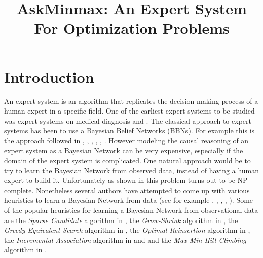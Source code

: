 \documentclass[11pt, letterpaper]{article}
\title{AskMinmax: An Expert System For Optimization Problems}
\author{}
\theoremstyle{definition}
\theoremstyle{remark}
\begin{document}
\maketitle

\section{Introduction}
An expert system is an algorithm that replicates the decision making
process of a human expert in a specific field. One of the earliest expert systems to be
studied was expert systems on medical diagnosis \cite{feigenbaum1979themes} and
\cite{lindsay1993dendral}. The classical approach to expert systems has been to use 
a Bayesian Belief Networks (BBNs). For example this is the approach followed in 
\cite{neapolitan2012probabilistic}, \cite{cowell2006probabilistic},
 \cite{cooper1992bayesian}, \cite{heckerman1998tutorial}, \cite{lauritzen1988local}, \cite{spiegelhalter1993bayesian}.
 However modeling the causal reasoning of an expert system as a Bayesian Network can be very expensive, especially
 if the domain of the expert system is complicated. One natural approach would be to try to learn the Bayesian
 Network from observed data, instead of having a human expert to build it. Unfortunately as shown in \cite{chickering1996learning}
  this problem turns out to be NP-complete. Nonetheless several authors have attempted to come up with various heuristics
  to learn a Bayesian Network from data (see for example \cite{margaritis2003learning}, \cite{cheng1997learning}, 
 \cite{friedman1997sequential}, \cite{heckerman1995learning}, \cite{friedman1999learning}). Some of the popular
 heuristics for learning a Bayesian Network from observational data are the \emph{Sparse Candidate} algorithm in 
 \cite{friedman1999learning}, the \emph{Grow-Shrink} algorithm in 
\cite{margaritis2003learning}, the \emph{Greedy Equivalent Search} algorithm in \cite{chickering2003optimal},
the \emph{Optimal Reinsertion} algorithm in \cite{moore2003optimal},
the \emph{Incremental Association} algorithm in  \cite{tsamardinos2003algorithms}
and \cite{yaramakala2005speculative} and the \emph{Max-Min Hill Climbing} algorithm in \cite{tsamardinos2006max}.
   
\end{document}
